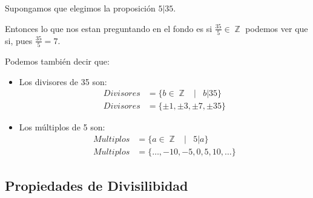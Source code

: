 \documentclass[12pt]{report}                                    %
\DeclareMathOperator \Space {\quad}                             %
\DeclareMathOperator \MiniSpace {\;}                            %
\newcommand \Such {\MiniSpace|\MiniSpace}                       %
\DeclareMathOperator \Integers  {\mathbb{Z}}                     %
\begin{document}
            Supongamos que elegimos la proposición $5|35$.

            Entonces lo que nos estan preguntando en el fondo es si $\frac{35}{5} \in \Integers$
            podemos ver que si, pues $\frac{35}{5} = 7$.

            Podemos también decir que:

            \begin{itemize}

                \item Los divisores de 35 son:
                    \begin{equation*}
                    \begin{split}
                        Divisores &= \{ b \in \Integers \Such b|35 \}   \\
                        Divisores &= \{ \pm 1, \pm 3, \pm 7, \pm 35 \}
                    \end{split}
                    \end{equation*}


                \item Los múltiplos de 5 son:
                    \begin{equation*}
                    \begin{split}
                        Multiplos &= \{ a \in \Integers \Such 5|a   \}  \\
                        Multiplos &= \{ \dots,-10,-5,0,5,10, \dots  \}
                    \end{split}
                    \end{equation*}

            \end{itemize}







        \clearpage
        \subsection{Propiedades de Divisilibidad}
\end{document}
